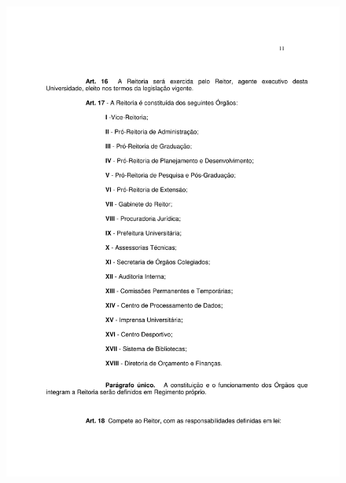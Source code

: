 \begin{figure}[p]
	\centering 
	\includegraphics[scale=0.7]{capitulos/resolucoes/cuni414/cuni414-11.pdf}
\end{figure}

